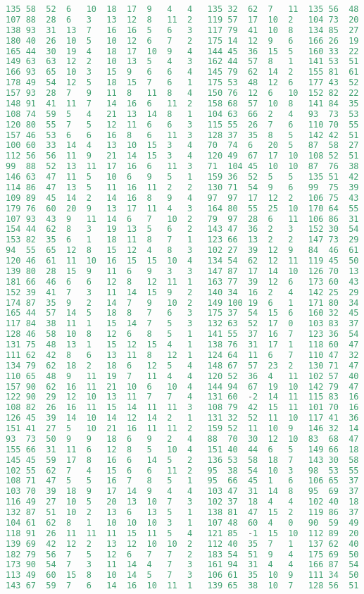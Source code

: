 \begin{lstlisting}[language=Python]
135	58	52	6	10	18	17	9	4	4	135	32	62	7	11	135	56	48	1	0
107	88	28	6	3	13	12	8	11	2	119	57	17	10	2	104	73	20	-6	9
138	93	31	13	7	16	16	5	6	3	117	79	41	10	8	134	85	27	11	3
180	40	26	10	5	10	12	6	7	2	175	14	12	9	6	166	26	19	1	2
165	44	30	19	4	18	17	10	9	4	144	45	36	15	5	160	33	22	10	3
149	63	63	12	2	10	13	5	4	3	162	44	57	8	1	141	53	51	-1	9
166	93	65	10	3	15	9	6	6	4	145	79	62	14	2	155	81	61	-5	0
178	49	54	12	5	18	15	7	6	1	175	53	48	12	6	177	43	52	0	6
157	93	28	7	9	11	8	11	8	4	150	76	12	6	10	152	82	22	1	1
148	91	41	11	7	14	16	6	11	2	158	68	57	10	8	141	84	35	-3	1
108	74	59	5	4	21	13	14	8	1	104	63	66	2	4	93	73	53	1	10
120	80	55	7	5	12	11	6	6	3	115	55	26	7	6	110	70	55	6	4
157	46	53	6	6	16	8	6	11	3	128	37	35	8	5	142	42	51	-4	2
100	60	33	14	4	13	10	15	3	4	70	74	6	20	5	87	58	27	10	1
112	56	56	11	9	21	14	15	3	4	120	49	67	17	10	108	52	51	0	1
99	88	52	13	11	17	16	6	11	3	71	104	45	10	10	87	76	38	7	8
146	63	47	11	5	10	6	9	5	1	159	36	52	5	5	135	51	42	8	3
114	86	47	13	5	11	16	11	2	2	130	71	54	9	6	99	75	39	6	9
109	89	45	14	2	14	16	8	9	4	97	97	17	12	2	106	75	43	11	13
179	76	60	20	9	13	17	11	4	3	164	80	55	25	10	170	64	55	8	3
107	93	43	9	11	14	6	7	10	2	79	97	28	6	11	106	86	31	6	6
154	44	62	8	3	19	13	5	6	2	143	47	36	2	3	152	30	54	6	2
153	82	35	6	1	18	11	8	7	1	123	66	13	2	2	147	73	29	1	1
94	55	65	12	8	15	12	4	8	3	102	27	39	12	9	84	46	61	10	5
120	46	61	11	10	16	15	15	10	4	134	54	62	12	11	119	45	50	1	3
139	80	28	15	9	11	6	9	3	3	147	87	17	14	10	126	70	13	3	3
181	66	46	6	6	12	8	12	11	1	163	77	39	12	6	173	60	43	5	2
152	39	41	7	3	11	14	15	9	2	140	34	16	2	4	142	25	29	4	2
174	87	35	9	2	14	7	9	10	2	149	100	19	6	1	171	80	34	-5	1
165	44	57	14	5	18	8	7	6	3	175	37	54	15	6	160	32	45	0	0
117	84	38	11	1	15	14	7	5	3	132	63	52	17	0	103	83	37	7	14
128	46	58	10	8	12	6	8	5	1	141	55	37	16	7	123	36	54	-2	4
131	75	48	13	1	15	12	15	4	1	138	76	31	17	1	118	60	47	-2	7
111	62	42	8	6	13	11	8	12	1	124	64	11	6	7	110	47	32	-3	6
134	79	62	18	2	18	6	12	5	4	148	67	57	23	2	130	71	47	10	6
110	65	48	9	11	19	7	11	4	4	120	52	36	4	11	102	57	40	9	11
157	90	62	16	11	21	10	6	10	4	144	94	67	19	10	142	79	47	15	4
122	90	29	12	10	13	11	7	7	4	131	60	-2	14	11	115	83	16	9	2
108	82	26	16	11	15	14	11	11	3	108	79	42	15	11	101	70	16	7	0
126	45	39	14	10	14	12	14	2	1	131	32	52	11	10	117	41	36	6	5
151	41	27	5	10	21	16	11	11	2	159	52	11	10	9	146	32	14	3	5
93	73	50	9	9	18	6	9	2	4	88	70	30	12	10	83	68	47	6	8
155	66	31	11	6	12	8	5	10	4	151	40	44	6	5	149	66	18	-4	5
145	45	59	17	8	16	6	14	5	2	136	53	58	18	7	143	30	58	6	3
102	55	62	7	4	15	6	6	11	2	95	38	54	10	3	98	53	55	-1	4
108	71	47	5	5	16	7	8	5	1	95	66	45	1	6	106	65	37	3	5
103	70	39	18	9	17	14	9	4	4	103	47	31	14	8	95	69	37	5	8
116	49	27	10	5	20	13	10	7	3	102	37	18	4	4	102	40	18	4	1
132	87	51	10	2	13	6	13	5	1	138	81	47	15	2	119	86	37	-2	5
104	61	62	8	1	10	10	10	3	1	107	48	60	4	0	90	59	49	-2	14
118	91	26	11	11	11	15	11	5	4	121	85	-1	15	10	112	89	20	5	5
139	69	42	12	2	13	12	10	10	2	112	40	35	7	1	137	62	40	8	10
182	79	56	7	5	12	6	7	7	2	183	54	51	9	4	175	69	50	2	7
173	90	54	7	3	11	14	4	7	3	161	94	31	4	4	166	87	54	7	2
113	49	60	15	8	10	14	5	7	3	106	61	35	10	9	111	34	50	7	2
143	67	59	7	6	14	16	10	11	1	139	65	38	10	7	128	56	51	-1	3


\end{lstlisting}
